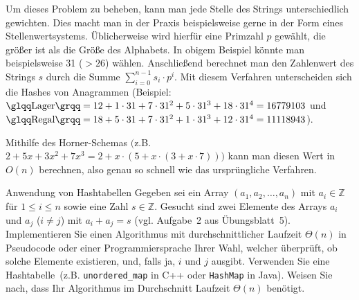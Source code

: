 \documentclass[11pt,a4paper]{article}
\begin{document}
\begin{loesung}
\begin{enumerate}
        Um dieses Problem zu beheben, kann man jede Stelle des Strings unterschiedlich gewichten.
        Dies macht man in der Praxis beispielsweise gerne in der Form eines Stellenwertsystems.
        Üblicherweise wird hierfür eine Primzahl $p$ gewählt, die größer ist als die Größe des Alphabets.
        In obigem Beispiel könnte man beispielsweise 31 ($> 26$) wählen.
        Anschließend berechnet man den Zahlenwert des Strings $s$ durch die Summe $\sum_{i = 0}^{n - 1} s_i \cdot p^i$.
        Mit diesem Verfahren unterscheiden sich die Hashes von Anagrammen (Beispiel: $\text{\quotes{Lager}} = 12 + 1 \cdot 31 + 7 \cdot 31^2 + 5 \cdot 31^3 + 18 \cdot 31^4 = 16779103$ und $\text{\quotes{Regal}} = 18 + 5 \cdot 31 + 7 \cdot 31^2 + 1 \cdot 31^3 + 12 \cdot 31^4 = 11118943$).

        Mithilfe des Horner-Schemas $\big($z.B. $2+ 5x + 3x^2 + 7x^3 = 2 + x \cdot (5 + x \cdot (3 + x \cdot 7))$$\big)$ kann man diesen Wert in $O(n)$ berechnen, also genau so schnell wie das ursprüngliche Verfahren.

    \end{enumerate}
\end{loesung}

\begin{aufgabe}{4}{Anwendung von Hashtabellen}
    Gegeben sei ein Array $(a_1, a_2, \ldots, a_n)$ mit $a_i \in \mathbb{Z}$ für $1 \leq i \leq n$ sowie eine Zahl $s \in \mathbb{Z}$.
    Gesucht sind zwei Elemente des Arrays $a_i$ und $a_j$ ($i \neq j$) mit $a_i + a_j = s$ (vgl. Aufgabe~2 aus Übungsblatt~5).
    Implementieren Sie einen Algorithmus mit durchschnittlicher Laufzeit $\Theta(n)$ in Pseudocode oder einer Programmiersprache Ihrer Wahl, welcher überprüft, ob solche Elemente existieren, und, falls ja, $i$ und $j$ ausgibt.
    Verwenden Sie eine Hash\-ta\-bel\-le~(z.B. \texttt{unordered\_map} in C++ oder \texttt{HashMap} in Java).
    Weisen Sie nach, dass Ihr Algorithmus im Durchschnitt Laufzeit $\Theta(n)$ benötigt.
\end{aufgabe}
\end{document}
